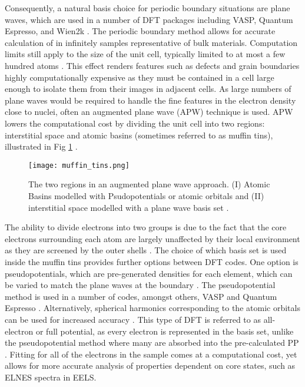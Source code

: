 Consequently, a natural basis choice for periodic boundary situations are plane waves, which are used in a number of DFT packages including VASP, Quantum Espresso, and Wien2k \cite{qe,vasp,wien2k}.  The periodic boundary method allows for accurate calculation of in infinitely samples representative of bulk materials.  Computation limits still apply to the size of the unit cell, typically limited to at most a few hundred atoms \cite{mohr_linear_2018}.  This effect renders features such as defects and grain boundaries highly computationally expensive as they must be contained in a cell large enough to isolate them from their images in adjacent cells. 
As large numbers of plane waves would be required to handle the fine features in the electron density close to nuclei, often an augmented plane wave (APW) technique is used.  APW lowers the computational cost by dividing the unit cell into two regions: interstitial space and atomic basins (sometimes referred to as muffin tins), illustrated in Fig \ref{MT} \cite{wien2k}. 
\begin{figure}
	\centering
	\texttt{[image: muffin\_tins.png]}
	\caption{The two regions in an augmented plane wave approach.  (I) Atomic Basins modelled with Psudopotentials or atomic orbitals and (II) interstitial space modelled with a plane wave basis set \cite{wien2k}. }
	\label{MT}   
\end{figure}

The ability to divide electrons into two groups is due to the fact that the core electrons surrounding each atom are largely unaffected by their local environment as they are screened by the outer shells \cite{wien2k}. The choice of which basis set is used inside the muffin tins provides further options between DFT codes.  One option is pseudopotentials, which are pre-generated densities for each element, which can be varied to match the plane waves at the boundary \cite{singh_planewaves_2006}.  The pseudopotential method is used in a number of codes, amongst others, VASP and Quantum Espresso \cite{vasp,qe}.  Alternatively, spherical harmonics corresponding to the atomic orbitals can be used for increased accuracy \cite{griffiths}. This type of DFT is referred to as all-electron or full potential, as every electron is represented in the basis set, unlike the pseudopotential method where many are absorbed into the pre-calculated PP \cite{wien2k}. Fitting for all of the electrons in the sample comes at a computational cost, yet allows for more accurate analysis of properties dependent on core states, such as ELNES spectra in EELS.   
 
